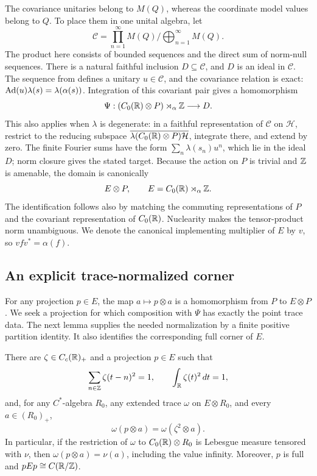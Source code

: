 The covariance unitaries belong to \(M(Q)\), whereas the coordinate model
values belong to \(Q\). To place them in one unital algebra, let
\[
 \mathcal C=\prod_{n=1}^{\infty}M(Q)\Big/
             \bigoplus_{n=1}^{\infty}M(Q).
\]
The product here consists of bounded sequences and the direct sum
of norm-null sequences. There is a natural faithful inclusion
\(D\subseteq\mathcal C\), and \(D\) is an ideal in
\(\mathcal C\).
The sequence from  defines a unitary
\(u\in\mathcal C\), and the covariance relation is exact:
\(\operatorname{Ad}(u)\lambda(s)=\lambda(\alpha(s))\).
Integration of this covariant pair gives a homomorphism
\begin{equation}\label{pt:crossed-map}
 \Psi:(C_0(\mathbb R)\otimes P)\rtimes_\alpha\mathbb Z
       \longrightarrow D.
\end{equation}
This also applies when \(\lambda\) is degenerate: in a faithful
representation of \(\mathcal C\) on \(\mathcal H\), restrict to the reducing
subspace \(\overline{\lambda(C_0(\mathbb R)\otimes P)\mathcal H}\),
integrate there, and extend by zero. The finite Fourier sums
have the form \(\sum_n\lambda(s_n)u^n\), which lie in the
ideal \(D\); norm closure gives the stated target.
Because the action on \(P\) is trivial and \(\mathbb Z\) is
amenable, the domain is canonically
\[
 E\otimes P,\qquad E=C_0(\mathbb R)\rtimes_\alpha\mathbb Z.
\]
The identification follows also by matching the commuting
representations of \(P\) and the covariant representation
of \(C_0(\mathbb R)\).  Nuclearity makes the tensor-product norm
unambiguous.  We denote the canonical implementing
multiplier of \(E\) by \(v\), so \(vf v^*=\alpha(f)\).

\subsection{An explicit trace-normalized corner}

For any projection \(p\in E\), the map \(a\mapsto p\otimes a\)
is a homomorphism from \(P\) to \(E\otimes P\). We seek a
projection for which composition with \(\Psi\) has exactly the
point trace data. The next lemma supplies the needed normalization
by a finite positive partition identity. It also identifies the
corresponding full corner of \(E\).

\begin{lemma}\label{pt:corner}
There are \(\zeta\in C_c(\mathbb R)_+\) and a projection \(p\in E\)
such that
\[
 \sum_{n\in\mathbb Z}\zeta(t-n)^2=1,
 \qquad \int_\mathbb R\zeta(t)^2\,dt=1,
\]
and, for any \(C^*\)-algebra \(R_0\), any extended trace
\(\omega\) on \(E\otimes R_0\), and every \(a\in(R_0)_+\),
\begin{equation}\label{pt:corner-trace}
 \omega(p\otimes a)=\omega(\zeta^2\otimes a).
\end{equation}
In particular, if the restriction of \(\omega\) to
\(C_0(\mathbb R)\otimes R_0\) is Lebesgue measure tensored with
\(\nu\), then \(\omega(p\otimes a)=\nu(a)\), including
the value infinity. Moreover, \(p\) is full and
\(pEp\cong C(\mathbb R/\mathbb Z)\).
\end{lemma}

